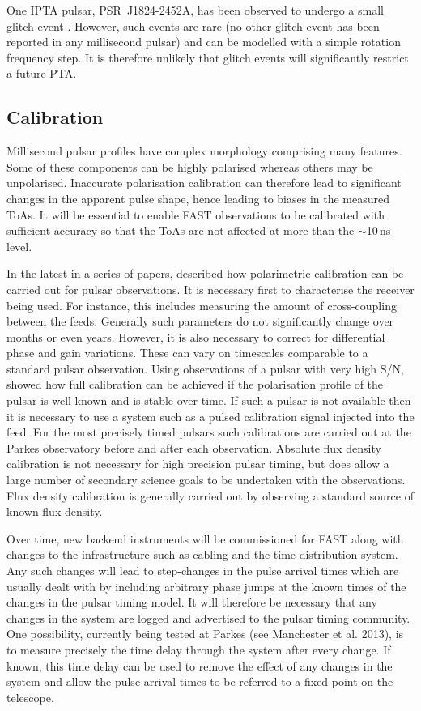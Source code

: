 \documentclass{raa}            %
\begin{document}
One IPTA pulsar, PSR~J1824-2452A, has been observed to undergo a small glitch event \citep{cb04}.  However, such events are rare (no other glitch event has been reported in any millisecond pulsar) and can be modelled with a simple rotation frequency step. It is therefore unlikely that glitch events will significantly restrict a future PTA.  




\subsection{Calibration}

Millisecond pulsar profiles have complex morphology comprising many features.  Some of these components can be highly polarised whereas others may be unpolarised.  Inaccurate polarisation calibration can therefore lead to significant changes in the apparent pulse shape, hence leading to biases in the measured ToAs.  It will be essential to enable FAST observations to be calibrated with sufficient accuracy so that the ToAs are not affected at more than the $\sim$10\,ns level. 

In the latest in a series of papers, \cite{van13} described how polarimetric calibration can be carried out for pulsar observations.  It is necessary first to characterise the receiver being used.  For instance, this includes measuring the amount of cross-coupling between the feeds. Generally such parameters do not significantly change over months or even years.  However, it is also necessary to correct for differential phase and gain variations.  These can vary on timescales comparable to a standard pulsar observation.   Using observations of a pulsar with very high S/N, \cite{van13} showed how full calibration can be achieved if the polarisation profile of the pulsar is well known and is stable over time.  If such a pulsar is not available then it is necessary to use a system such as a pulsed calibration signal injected into the feed.  For the most precisely timed pulsars such calibrations are carried out at the Parkes observatory before and after each observation.  Absolute flux density calibration is not necessary for high precision pulsar timing, but does allow a large number of secondary science goals to be undertaken with the observations.  Flux density calibration is generally carried out by observing a standard source of known flux density. 

Over time, new backend instruments will be commissioned for FAST along with changes to the infrastructure such as cabling and the time distribution system.  Any such changes will lead to step-changes in the pulse arrival times which are usually dealt with  by including arbitrary phase jumps at the known times of the changes in the pulsar timing model.  It will therefore be necessary that any changes in the system are logged and advertised to the pulsar timing community. One possibility, currently being tested at Parkes (see Manchester et al. 2013\nocite{mhb+13}), is to measure precisely the time delay through the system after every change.  If known, this time delay can be used to remove the effect of any changes in the system and allow the pulse arrival times to be referred to a fixed point on the telescope.
\end{document}
